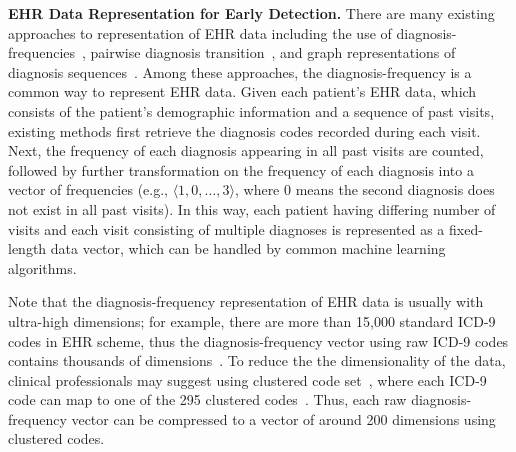 \textbf{EHR Data Representation for Early Detection.} There are many existing approaches to representation of EHR data including the use of diagnosis-frequencies~\cite{sun2012supervised,7091853,personalized2015}, pairwise diagnosis transition~\cite{zhang_mseq_2015,jensen2001mining}, and graph representations of diagnosis sequences~\cite{liu_temporal_2015}. Among these approaches, the diagnosis-frequency is a common way to represent EHR data. Given each patient's EHR data, which consists of the patient's demographic information and a sequence of past visits, existing methods first retrieve the diagnosis codes recorded during each visit. Next, the frequency of each diagnosis appearing in all past visits are counted, followed by further transformation on the frequency of each diagnosis into a vector of frequencies (e.g., $\langle 1, 0, \dots, 3\rangle$, where 0 means the second diagnosis does not exist in all past visits). In this way, each patient having differing number of visits and each visit consisting of multiple diagnoses is represented as a fixed-length data vector, which can be handled by common machine learning algorithms.
 
Note that the diagnosis-frequency representation of EHR data is usually with ultra-high dimensions; for example, there are more than 15,000 standard ICD-9 codes in EHR scheme, thus the diagnosis-frequency vector using raw ICD-9 codes contains thousands of dimensions~\cite{clusteredcodes}.
%
To reduce the the dimensionality of the data, clinical professionals may suggest using clustered code set~\cite{clusteredcodes}, where each ICD-9 code can map to  one of the 295 clustered codes~\cite{zhang_mseq_2015}. Thus, each raw diagnosis-frequency vector can be compressed to a vector of around 200 dimensions using clustered codes.

 

